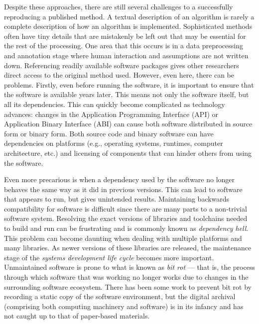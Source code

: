Despite these approaches, there are still several challenges to a successfully
reproducing a published method.
{ %
	A textual description of an algorithm is rarely a complete description of
	how an algorithm is implemented. Sophisticated methods often have tiny details
	that are mistakenly be left out that may be essential for the rest of the
	processing. One area that this occurs is in a data preprocessing and annotation
	stage where human interaction and assumptions are not written down.
}
{ %
	Referencing readily available software packages gives
	other researchers direct access to the original method
	used. However, even here, there can be problems. Firstly,
	even before running the software, it is important to
	ensure that the
	software is available years later. This means not only the software itself, but
	all its dependencies. This can quickly become complicated as technology
	advances: changes in the Application Programming Interface (API) or Application
	Binary Interface (ABI) can cause both software distributed in source form or
	binary form. Both source code and binary software can have
	dependencies on platforms (e.g., operating systems,
	runtimes, computer architecture, etc.) and licensing of
	components that can hinder others from using the software.
}

{ %
	Even more precarious is when a dependency used by the
	software no longer behaves the same way as it did in
	previous versions. This can lead to software that appears
	to run, but gives unintended results.  Maintaining
	backwards compatibility for software is difficult since
	there are many parts to a non-trivial software system.
	Resolving the exact versions of libraries and toolchains
	needed to build and run can be frustrating and is commonly
	known as \emph{dependency hell}. This problem can become
	daunting when dealing with multiple platforms and many
	libraries. As newer versions of these libraries are
	released, the maintenance stage of the \emph{systems
	development life cycle} becomes more important.
	Unmaintained software is prone to what is known as
	\emph{bit rot} --- that is, the process through which
	software that was working no longer works due to changes
	in the surrounding software ecosystem.
	There has been some work to prevent bit rot by recording a
	static copy of the software environment, but the digital
	archival (comprising both computing machinery and
	software) is in its infancy and has not caught up to that
	of paper-based materials.
}


